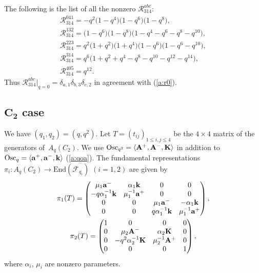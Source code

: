\begin{example}\label{a:ex:a21}
The following is the list of all the nonzero $\mathscr{R}^{abc}_{314}$:
\begin{gather*}
\mathscr{R}^{041}_{314}  = -q^2 \big(1 - q^4\big) \big(1 - q^6\big) \big(1 - q^8\big), \\
%
\mathscr{R}^{132}_{314}  =\big(1 - q^6\big) \big(1 - q^8\big)\big(1 - q^4 - q^6 - q^8 - q^{10}\big),\\
%
\mathscr{R}^{223}_{314}  = q^2 \big(1 + q^2\big) \big(1 + q^4\big) \big(1 - q^6\big) \big(1 - q^6 - q^{10}\big), \\
%
\mathscr{R}^{314}_{314}  =q^6\big(1 + q^2 + q^4 - q^8 - q^{10} - q^{12} - q^{14}\big),\\
%
\mathscr{R}^{405}_{314}  =q^{12}.
\end{gather*}
Thus $\mathscr{R}^{abc}_{314}|_{q=0}=\delta_{a,1}\delta_{b,3}\delta_{c,2}$
in agreement with (\ref{a:r0}).
\end{example}


\subsection[$C_2$ case]{$\boldsymbol{C_2}$ case}\label{a:ss:c2}

We have $(q_1,q_2)=(q,q^2)$.
Let $T=(t_{ij})_{1\le i,j \le 4}$ be the
$4\times 4$ matrix of the generators of~$A_q(C_2)$.
We  use
$\mathrm{Osc}_{q^2} =
\langle  {\rm{\bf A}}^+, {\rm{\bf A}}^-, {\rm{\bf K}} \rangle$
in addition to
$\mathrm{Osc}_q =
\langle  {\rm{\bf a}}^+, {\rm{\bf a}}^-, {\rm{\bf k}} \rangle$
(\ref{a:qoa}).
The fundamental representations
$\pi_i: A_q(C_2) \rightarrow \mathrm{End}(\mathcal{F}_{q_i})$
$(i=1,2)$ are given by
\begin{gather}
\pi_1(T) =
\begin{pmatrix}
\mu_1{\rm{\bf a}}^- & \alpha_1{\rm {\bf k}} &  0& 0\\
-q\alpha^{-1}_1{\rm {\bf k}}& \mu^{-1}_1{\rm{\bf a}}^+ &  0& 0\\
0 & 0 & \mu_1{\rm{\bf a}}^- & -\alpha_1{\rm {\bf k}} \\
0 & 0 & q\alpha_1^{-1}{\rm {\bf k}} & \mu_1^{-1}{\rm{\bf a}}^+
\end{pmatrix},
\nonumber\\
\pi_2(T) =
\begin{pmatrix}
1  & 0 & 0 & 0 \\
0 & \mu_2{\rm{\bf A}}^- & \alpha_2{\rm{\bf K}} & 0 \\
0 & -q^2\alpha^{-1}_2{\rm{\bf K}} & \mu_2^{-1}{\rm{\bf A}}^+ & 0 \\
0 & 0 & 0  & 1
\end{pmatrix},\label{a:piTc}
\end{gather}
where $\alpha_i$, $\mu_i$ are nonzero parameters.

